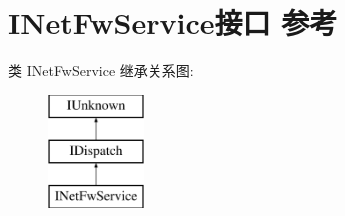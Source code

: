 \hypertarget{interface_i_net_fw_service}{}\section{I\+Net\+Fw\+Service接口 参考}
\label{interface_i_net_fw_service}
类 I\+Net\+Fw\+Service 继承关系图\+:\begin{figure}[H]
\begin{center}
\leavevmode
\includegraphics[height=3.000000cm]{interface_i_net_fw_service}
\end{center}
\end{figure}
